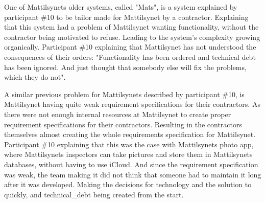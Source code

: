 

One of Mattilsynets older systems, called "Mats", is a system explained by participant \#10 to be tailor made for Mattilsynet by a contractor. Explaining that this system had a problem of Mattilsynet wanting functionality, without the contractor being motivated to refuse. Leading to the system's complexity growing organically. Participant \#10 explaining that Mattilsynet has not understood the consequences of their orders: "Functionality has been ordered and technical debt has been ignored. And just thought that somebody else will fix the problems, which they do not".


A similar previous problem for Mattilsynets described by participant \#10, is Mattilsynet having quite weak requirement specifications for their contractors. As there were not enough internal resources at Mattilsynet to create proper requirement specifications for their contractors. Resulting in the contractors themselves almost creating the whole requirements specification for Mattilsynet. Participant \#10 explaining that this was the case with Mattilsynets photo app, where Mattilsynets inspectors can take pictures and store them in Mattilsynets databases, without having to use iCloud. And since the requirement specification was weak, the team making it did not think that someone had to maintain it long after it was developed. Making the decisions for technology and the solution to quickly, and \gls{technical_debt} being created from the start.

